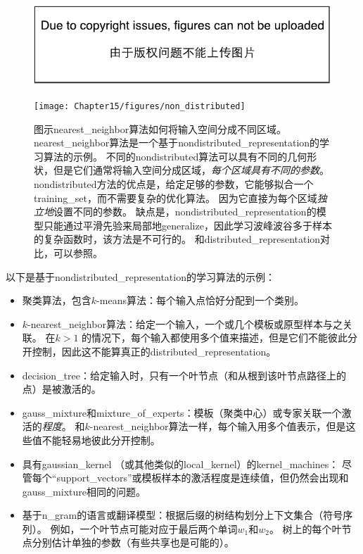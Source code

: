\begin{figure}[!htb]
\ifOpenSource
\centerline{\includegraphics{figure.pdf}}
\else
\centerline{\texttt{[image: Chapter15/figures/non\_distributed]}}
\fi
\caption{图示\gls{nearest_neighbor}算法如何将输入空间分成不同区域。
\gls{nearest_neighbor}算法是一个基于\gls{nondistributed_representation}的学习算法的示例。
不同的\gls{nondistributed}算法可以具有不同的几何形状，但是它们通常将输入空间分成区域，\emph{每个区域具有不同的参数}。
\gls{nondistributed}方法的优点是，给定足够的参数，它能够拟合一个\gls{training_set}，而不需要复杂的优化算法。
因为它直接为每个区域\emph{独立地}设置不同的参数。
缺点是，\gls{nondistributed_representation}的模型只能通过平滑先验来局部地\gls{generalize}，因此学习波峰波谷多于样本的复杂函数时，该方法是不可行的。
和\gls{distributed_representation}对比，可以参照。
}
\label{fig:chap15_nondistributed}
\end{figure}


以下是基于\gls{nondistributed_representation}的学习算法的示例：
\begin{itemize}
	\item 聚类算法，包含$k$-means算法：每个输入点恰好分配到一个类别。

	\item $k$-\gls{nearest_neighbor}算法：给定一个输入，一个或几个模板或原型样本与之关联。
	在$k >  1$ 的情况下，每个输入都使用多个值来描述，但是它们不能彼此分开控制，因此这不能算真正的\gls{distributed_representation}。

	\item \gls{decision_tree}：给定输入时，只有一个叶节点（和从根到该叶节点路径上的点）是被激活的。

	\item \gls{gauss_mixture}和\gls{mixture_of_experts}：模板（聚类中心）或专家关联一个激活的\emph{程度}。
	和$k$-\gls{nearest_neighbor}算法一样，每个输入用多个值表示，但是这些值不能轻易地彼此分开控制。

	\item 具有\gls{gaussian_kernel} （或其他类似的\gls{local_kernel}）的\gls{kernel_machines}： 尽管每个``\gls{support_vectors}''或模板样本的激活程度是连续值，但仍然会出现和\gls{gauss_mixture}相同的问题。

	\item 基于\gls{n_gram}的语言或翻译模型：根据后缀的树结构划分上下文集合（符号序列）。
	例如，一个叶节点可能对应于最后两个单词$w_1$和$w_2$。
	树上的每个叶节点分别估计单独的参数（有些共享也是可能的）。
\end{itemize}


